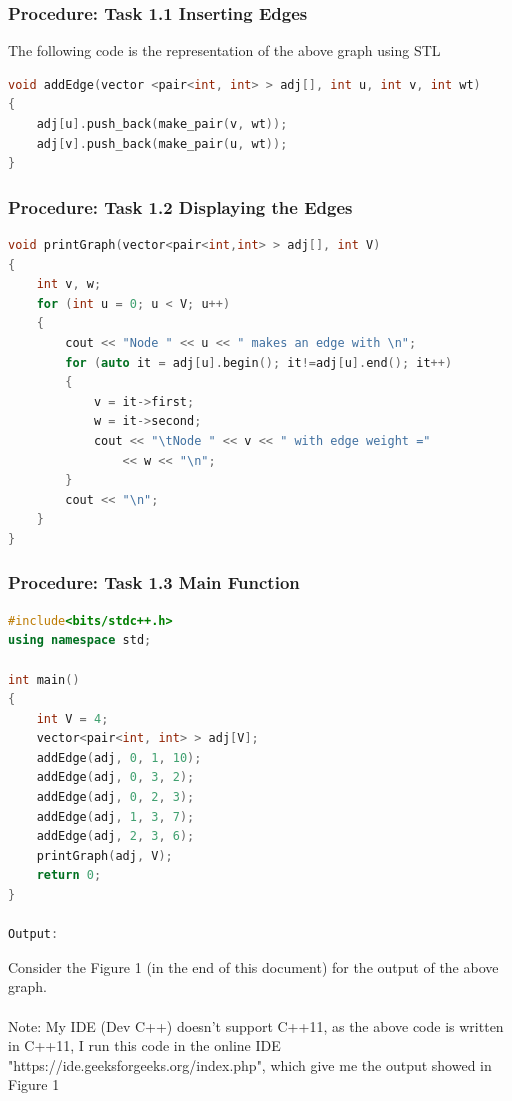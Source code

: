 \documentclass[11pt]{article}            %
\begin{document}
\subsubsection{Procedure: Task 1.1 Inserting Edges}
The following code is the representation of the above graph using STL
\begin{lstlisting}[language=C++]
void addEdge(vector <pair<int, int> > adj[], int u, int v, int wt)
{
	adj[u].push_back(make_pair(v, wt));
	adj[v].push_back(make_pair(u, wt));
}
\end{lstlisting}

\subsubsection{Procedure: Task 1.2 Displaying the Edges}     
\begin{lstlisting}[language=C++]
void printGraph(vector<pair<int,int> > adj[], int V)
{
	int v, w;
	for (int u = 0; u < V; u++)
	{
		cout << "Node " << u << " makes an edge with \n";
		for (auto it = adj[u].begin(); it!=adj[u].end(); it++)
		{
			v = it->first;
			w = it->second;
			cout << "\tNode " << v << " with edge weight ="
				<< w << "\n";
		}
		cout << "\n";
	}
}
\end{lstlisting}

\subsubsection{Procedure: Task 1.3 Main Function}     
\begin{lstlisting}[language=C++]
#include<bits/stdc++.h>
using namespace std;

int main()
{
	int V = 4;
	vector<pair<int, int> > adj[V];
	addEdge(adj, 0, 1, 10);
	addEdge(adj, 0, 3, 2);
	addEdge(adj, 0, 2, 3);
	addEdge(adj, 1, 3, 7);
	addEdge(adj, 2, 3, 6);
	printGraph(adj, V);
	return 0;
}

Output:
\end{lstlisting}
Consider the Figure 1 (in the end of this document) for the output of the above graph.\\~\\
Note: My IDE (Dev C++) doesn't support C++11, as the above code is written in C++11, I run this code in the online IDE "https://ide.geeksforgeeks.org/index.php", which give me the output showed in Figure 1
\end{document}
